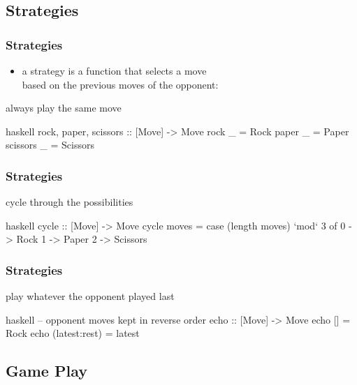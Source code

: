 \documentclass[dvipsnames]{beamer}
\theoremstyle{plain}
\begin{document}
\subsection{Strategies}

\begin{frame}[fragile]
  \frametitle{Strategies}

  \begin{itemize}
    \item a strategy is a function that selects a move\\
      based on the previous moves of the opponent:\\
      \smallskip
  \end{itemize}

  \pause
  \begin{exampleblock}{always play the same move}
    \begin{pygments}{haskell}
rock, paper, scissors :: [Move] -> Move
rock     _ = Rock
paper    _ = Paper
scissors _ = Scissors
    \end{pygments}
  \end{exampleblock}
\end{frame}

\begin{frame}[fragile]
  \frametitle{Strategies}

  \begin{exampleblock}{cycle through the possibilities}
    \begin{pygments}{haskell}
cycle :: [Move] -> Move
cycle moves =
    case (length moves) `mod` 3 of
      0 -> Rock
      1 -> Paper
      2 -> Scissors
    \end{pygments}
  \end{exampleblock}
\end{frame}

\begin{frame}[fragile]
  \frametitle{Strategies}

  \begin{exampleblock}{play whatever the opponent played last}
    \begin{pygments}{haskell}
-- opponent moves kept in reverse order
echo :: [Move] -> Move
echo []            = Rock
echo (latest:rest) = latest
    \end{pygments}
  \end{exampleblock}
\end{frame}

\subsection{Game Play}
\end{document}

